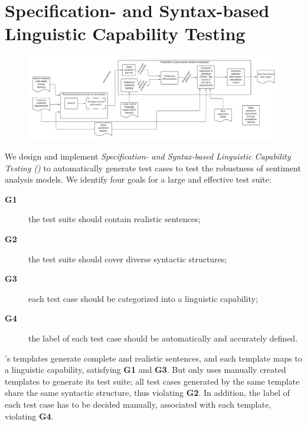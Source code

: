 \section{Specification- and Syntax-based Linguistic Capability Testing}

\begin{figure}
  \centering
  \includegraphics[width=\linewidth]{figs/overview.pdf}
  \caption{\OverviewFigCaption}
\end{figure}

  We design and implement
\emph{Specification- and Syntax-based Linguistic Capability Testing
  (\tool)} to automatically generate test cases to test the
robustness of sentiment analysis models. We identify four goals for a
large and effective test suite:

\begin{description}
\item[{\bf G1}] the test suite should contain realistic sentences;
\item[{\bf G2}] the test suite should cover diverse syntactic
  structures;
  \item[{\bf G3}] each test case should be categorized into a
    linguistic capability;
\item[{\bf G4}] the label of each test case should be
automatically and accurately defined.
\end{description}

\Chlst's templates generate complete and realistic sentences, and each
template maps to a linguistic capability, satisfying {\bf G1} and {\bf
  G3}. But \Chlst only uses  manually created templates to
generate its test suite; all test cases generated by the same template
share the same syntactic structure, thus violating {\bf G2}. In
addition, the label of each \Chlst test case has to be decided
manually, associated with each template, violating {\bf G4}.

